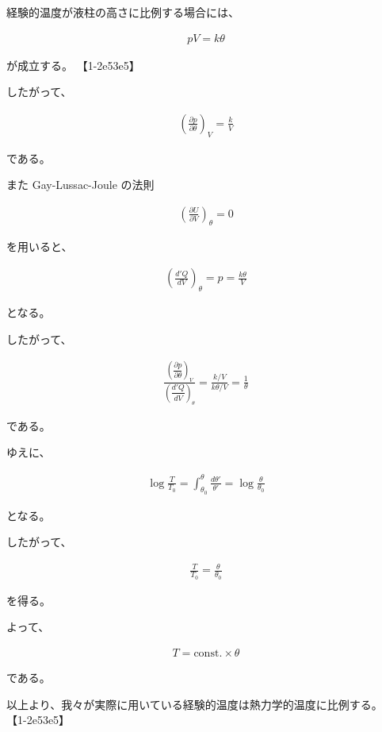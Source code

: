\documentclass[platex,dvipdfmx,a4paper]{jsarticle}
\begin{document}
経験的温度が液柱の高さに比例する場合には、

\begin{align*}
pV=k\theta
\end{align*}

が成立する。 【1-2e53e5】

したがって、

\begin{align*}
\left(
\frac{\partial p}{\partial \theta}
\right)_V
=
\frac{k}{V}
\end{align*}

である。

また Gay-Lussac-Joule の法則

\begin{align*}
\left(
\frac{\partial U}{\partial V}
\right)_\theta
=
0
\end{align*}

を用いると、

\begin{align*}
\left(
\frac{d'Q}{dV}
\right)_\theta
=
p
=
\frac{k\theta}{V}
\end{align*}

となる。

したがって、

\begin{align*}
\frac{
\left(
\dfrac{\partial p}{\partial \theta}
\right)_V
}{
\left(
\dfrac{d'Q}{dV}
\right)_\theta
}
=
\frac{k/V}{k\theta/V}
=
\frac1\theta
\end{align*}

である。

ゆえに、

\begin{align*}
\log\frac{T}{T_0}
=
\int_{\theta_0}^{\theta}
\frac{d\theta'}{\theta'}
=
\log\frac{\theta}{\theta_0}
\end{align*}

となる。

したがって、

\begin{align*}
\frac{T}{T_0}
=
\frac{\theta}{\theta_0}
\end{align*}

を得る。

よって、

\begin{align*}
T
=
\mathrm{const.}\times \theta
\end{align*}

である。

以上より、我々が実際に用いている経験的温度は熱力学的温度に比例する。 【1-2e53e5】
\end{document}

